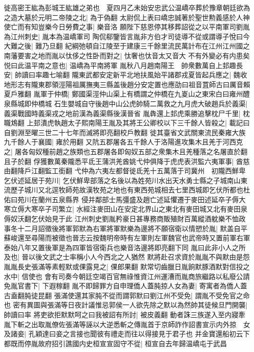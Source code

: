徙高密王紘為彭城王紘雄之弟也　夏四月乙未始安忠武公温嶠卒葬於豫章朝廷欲為之造大墓於元明二帝陵之北|{
	為于偽翻}
太尉侃上表曰嶠忠誠著於聖世勲義感於人神使亡而有知豈樂今日勞費之事|{
	樂音洛}
願陛下慈恩停其移葬詔從之以平南軍司劉胤為江州刺史|{
	胤本為温嶠軍司}
陶侃郗鑒皆言胤非方伯才司徒導不從或謂導子悅曰今大難之後|{
	難乃旦翻}
紀綱弛頓自江陵至于建康三千餘里流民萬計布在江州江州國之南藩要害之地而胤以忲侈之性卧而對之|{
	忲奢也忲音太又音大}
不有外變必有内患矣悦曰此温平南之意也|{
	温嶠為平南將軍}
胤秋八月趙南陽王　帥衆數萬自上邽趣長安|{
	帥讀曰率趣七喻翻}
隴東武都安定新平北地扶風始平諸郡戎夏皆起兵應之|{
	魏收地形志有隴東郡領涇陽祖厲撫夷三縣盖後趙分安定置也應劭曰祖音罝師古曰厲音賴夏戶雅翻}
胤軍于仲橋|{
	鄭國渠涇仲山渠上有橋謂之仲橋在九嵏山之東宋白曰雍州醴泉縣城即仲橋城}
石生嬰城自守後趙中山公虎帥騎二萬救之九月虎大破趙兵於義渠|{
	義渠戰國時義渠戎之地前漢為義渠縣後漢晉省}
胤犇還上邽虎乘勝追擊枕尸千里|{
	枕職鴆翻}
上邽潰虎執趙太子熙南陽王胤及其將王公卿校以下三千餘人皆殺之|{
	載記曰自劉淵至曜三世二十七年而滅將即亮翻校戶教翻}
徙其臺省文武關東流民秦雍大族九千餘人于襄國|{
	雍於用翻}
又阬五郡屠各五千餘人于洛陽進攻集木且羌于河西克之|{
	屠各匈奴種前趙之族類也五郡屠各即匈奴五部之衆集木且羌種落之名屠直於翻且子於翻}
俘獲數萬秦隴悉平氐王蒲洪羌酋姚弋仲俱降于虎虎表洪監六夷軍事|{
	酋慈由翻降戶江翻監工銜翻}
弋仲為六夷左都督徙氐羌十五萬落于司冀州　初隴西鮮卑乞伏述延居于苑川|{
	乞伏鮮卑部落之名後以為姓苑川水出天水勇士縣之子城南山東流歷子城川又北逕牧師苑故漢牧苑之地也有東西苑城相去七里西城即乞伏所都也杜佑曰苑川在蘭州五泉縣界}
侵并鄰部士馬彊盛及趙亡述延懼遷于麥田述延卒子傉大寒立傉大寒卒子司繁立|{
	水經注麥田山在安定北界山之東北有麥田城又北有麥田泉傉奴沃翻乞伏始見于此}
江州刺史劉胤矜豪日甚專務商販殖財百萬縱酒躭樂不恤政事冬十二月詔徵後將軍郭默為右軍將軍默樂為邊將不願宿衛以情愬於胤|{
	默盖自平蘇峻還至尋陽而被徵也晉志云按魏明帝時有左軍則左軍魏官也武帝時又置前軍右軍泰始八年又置後軍是為四軍皆宿衛兵也樂音洛邊將即亮翻下同}
胤曰此非小人之所及也|{
	晉以後文武之士率稱小人今西北之人猶然}
默將赴召求資於胤胤不與默由是怨胤胤長史張滿等素輕默或倮露見之|{
	倮郎果翻}
默常切齒臘日胤餉默豚酒默對信投之水中|{
	信使也}
會有司奏今朝廷空竭百官無祿惟資江州運漕而胤商旅繼路以私廢公請免胤官書下|{
	下遐稼翻}
胤不即歸罪方自申理僑人蓋肫掠人女為妻|{
	寄寓者為僑人蓋古盍翻肫徒昆翻}
張滿使還其家肫不從而謂郭默曰劉江州不受免|{
	謂胤不受免官之命也}
密有異圖與張滿等日夜計議惟忌郭侯一人欲先除之默以為然帥其徒候旦門開襲|{
	帥讀曰率}
將吏欲拒默默呵之曰我被詔有所討|{
	被皮義翻}
動者誅三族遂入至内寢牽胤下斬之出取胤僚佐張滿等誣以大逆悉斬之傳胤首于京師詐作詔書宣示内外掠　女及諸妾|{
	孔穎達曰妾之言接也聞彼有禮走而往以得接見于君子也}
并金寶還船初云下都既而停胤故府招引譙國内史桓宣宣固守不從|{
	桓宣自去年歸温嶠屯于武昌}
